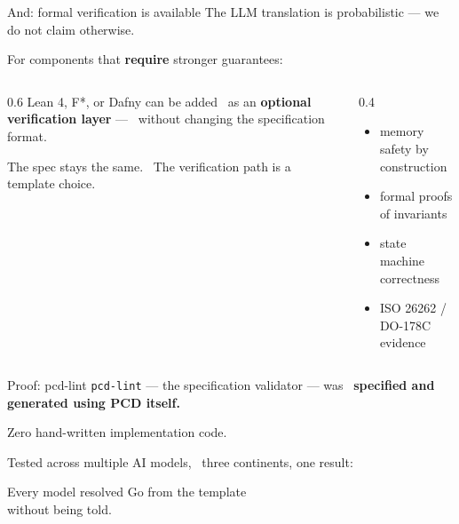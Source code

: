\documentclass[
  10pt,
  ignorenonframetext,
  aspectratio=169,
  10pt]{beamer}
\providecommand{\tightlist}{%
  \setlength{\itemsep}{0pt}\setlength{\parskip}{0pt}}
\begin{document}
\begin{frame}{And: formal verification is available}
\protect\hypertarget{and-formal-verification-is-available}{}
The LLM translation is probabilistic --- we do not claim otherwise.

\bigskip

For components that \textbf{require} stronger guarantees:

\bigskip

\begin{columns}[T]
\begin{column}{0.6\textwidth}
Lean 4, F*, or Dafny can be added~ as an \textbf{optional verification
layer} ---~ without changing the specification format.

The spec stays the same.~ The verification path is a template choice.
\end{column}

\begin{column}{0.4\textwidth}
\begin{itemize}
\tightlist
\item
  memory safety by construction
\item
  formal proofs of invariants
\item
  state machine correctness
\item
  ISO 26262 / DO-178C evidence
\end{itemize}
\end{column}
\end{columns}
\end{frame}

\begin{frame}[fragile]{Proof: pcd-lint}
\protect\hypertarget{proof-pcd-lint}{}
\texttt{pcd-lint} --- the specification validator --- was~
\textbf{specified and generated using PCD itself.}

Zero hand-written implementation code.

\bigskip

Tested across multiple AI models,~ three continents, one result:

\bigskip

\begin{center}
\Large Every model resolved Go from the template\\
\large without being told.
\end{center}
\end{frame}

\begin{frame}
\end{frame}
\end{document}
